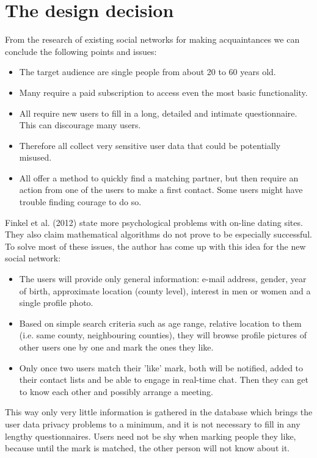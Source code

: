 \documentclass[12pt,oneside]{fithesis}
\begin{document}
\section{The design decision}
	From the research of existing social networks for making acquaintances we can conclude the following points and issues:
	\begin{itemize}
		\item The target audience are single people from about 20 to 60 years old.
		\item Many require a paid subscription to access even the most basic functionality.
		\item All require new users to fill in a long, detailed and intimate questionnaire. This can discourage many users.
		\item Therefore all collect very sensitive user data that could be potentially misused.
		\item All offer a method to quickly find a matching partner, but then require an action from one of the users to make a first contact. Some users might have trouble finding courage to do so.
	\end{itemize}
	Finkel et al. (2012) \cite{Finkel01012012} state more psychological problems with on-line dating sites. They also claim mathematical algorithms do not prove to be especially successful.
	To solve most of these issues, the author has come up with this idea for the new social network:
	\begin{itemize}
		\item The users will provide only general information: e-mail address, gender, year of birth, approximate location (county level), interest in men or women and a single profile photo.
		\item Based on simple search criteria such as age range, relative location to them (i.e. same county, neighbouring counties), they will browse profile pictures of other users one by one and mark the ones they like.
		\item Only once two users match their 'like' mark, both will be notified, added to their contact lists and be able to engage in real-time chat. Then they can get to know each other and possibly arrange a meeting.
	\end{itemize}
	
	This way only very little information is gathered in the database which brings the user data privacy problems to a minimum, and it is not necessary to fill in any lengthy questionnaires. Users need not be shy when marking people they like, because until the mark is matched, the other person will not know about it.
	
\end{document}
